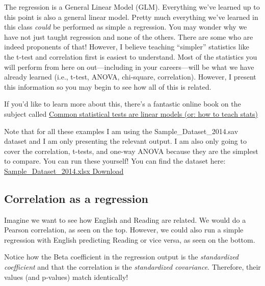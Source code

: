 \documentclass[
]{book}
\begin{document}
The regression is a General Linear Model (GLM). Everything we've learned up to this point is also a general linear model. Pretty much everything we've learned in this class \emph{could} be performed as simple a regression. You may wonder why we have not just taught regression and none of the others. There are some who are indeed proponents of that! However, I believe teaching ``simpler'' statistics like the t-test and correlation first is easiest to understand. Most of the statistics you will perform from here on out---including in your careers---will be what we have already learned (i.e., t-test, ANOVA, chi-square, correlation). However, I present this information so you may begin to see how all of this is related.

If you'd like to learn more about this, there's a fantastic online book on the subject called \href{https://lindeloev.github.io/tests-as-linear/}{Common statistical tests are linear models (or: how to teach stats)}

Note that for all these examples I am using the Sample\_Dataset\_2014.sav dataset and I am only presenting the relevant output. I am also only going to cover the correlation, t-tests, and one-way ANOVA because they are the simplest to compare. You can run these yourself! You can find the dataset here: \href{https://github.com/danawanzer/stats-with-jamovi/blob/master/data/Sample_Dataset_2014.xlsx}{Sample\_Dataset\_2014.xlsx Download}

\hypertarget{correlation-as-a-regression}{%
\subsection{Correlation as a regression}\label{correlation-as-a-regression}}

Imagine we want to see how English and Reading are related. We would do a Pearson correlation, as seen on the top. However, we could also run a simple regression with English predicting Reading or vice versa, as seen on the bottom.

Notice how the Beta coefficient in the regression output is the \emph{standardized coefficient} and that the correlation is the \emph{standardized covariance}. Therefore, their values (and p-values) match identically!
\end{document}
